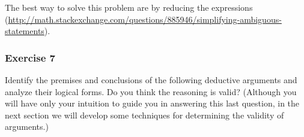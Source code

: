 
\begin{solution}
The best way to solve this problem are by reducing the
expressions (\url{http://math.stackexchange.com/questions/885946/simplifying-ambiguous-statements}).
\end{solution}



\subsubsection{Exercise 7}

\question Identify the premises and conclusions of the following deductive arguments and analyze their logical forms. Do you think the reasoning is valid?
(Although you will have only your intuition to guide you in answering
this last question, in the next section we will develop some techniques for
determining the validity of arguments.)

